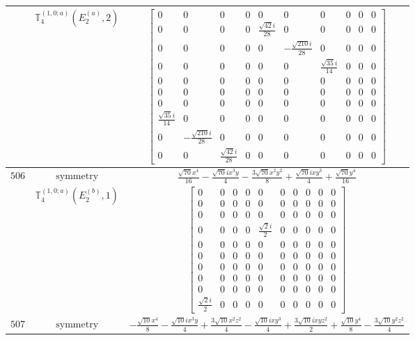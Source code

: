 \documentclass[fleqn,8pt,landscape]{jsarticle}
\begin{document}
\begin{longtable}{ccc}
$  $ & $ \mathbb{T}_{4}^{(1,0;a)}(E_{2}^{(a)},2) $ & $ \begin{bmatrix} 0 & 0 & 0 & 0 & 0 & 0 & 0 & 0 & 0 & 0 \\ 0 & 0 & 0 & 0 & \frac{\sqrt{42} i}{28} & 0 & 0 & 0 & 0 & 0 \\ 0 & 0 & 0 & 0 & 0 & - \frac{\sqrt{210} i}{28} & 0 & 0 & 0 & 0 \\ 0 & 0 & 0 & 0 & 0 & 0 & \frac{\sqrt{35} i}{14} & 0 & 0 & 0 \\ 0 & 0 & 0 & 0 & 0 & 0 & 0 & 0 & 0 & 0 \\ 0 & 0 & 0 & 0 & 0 & 0 & 0 & 0 & 0 & 0 \\ 0 & 0 & 0 & 0 & 0 & 0 & 0 & 0 & 0 & 0 \\ \frac{\sqrt{35} i}{14} & 0 & 0 & 0 & 0 & 0 & 0 & 0 & 0 & 0 \\ 0 & - \frac{\sqrt{210} i}{28} & 0 & 0 & 0 & 0 & 0 & 0 & 0 & 0 \\ 0 & 0 & \frac{\sqrt{42} i}{28} & 0 & 0 & 0 & 0 & 0 & 0 & 0 \end{bmatrix} $ \\ \hline
$ 506 $ & $ \text{symmetry} $ & $ \frac{\sqrt{70} x^{4}}{16} - \frac{\sqrt{70} i x^{3} y}{4} - \frac{3 \sqrt{70} x^{2} y^{2}}{8} + \frac{\sqrt{70} i x y^{3}}{4} + \frac{\sqrt{70} y^{4}}{16} $ \\
$  $ & $ \mathbb{T}_{4}^{(1,0;a)}(E_{2}^{(b)},1) $ & $ \begin{bmatrix} 0 & 0 & 0 & 0 & 0 & 0 & 0 & 0 & 0 & 0 \\ 0 & 0 & 0 & 0 & 0 & 0 & 0 & 0 & 0 & 0 \\ 0 & 0 & 0 & 0 & 0 & 0 & 0 & 0 & 0 & 0 \\ 0 & 0 & 0 & 0 & \frac{\sqrt{2} i}{2} & 0 & 0 & 0 & 0 & 0 \\ 0 & 0 & 0 & 0 & 0 & 0 & 0 & 0 & 0 & 0 \\ 0 & 0 & 0 & 0 & 0 & 0 & 0 & 0 & 0 & 0 \\ 0 & 0 & 0 & 0 & 0 & 0 & 0 & 0 & 0 & 0 \\ 0 & 0 & 0 & 0 & 0 & 0 & 0 & 0 & 0 & 0 \\ 0 & 0 & 0 & 0 & 0 & 0 & 0 & 0 & 0 & 0 \\ \frac{\sqrt{2} i}{2} & 0 & 0 & 0 & 0 & 0 & 0 & 0 & 0 & 0 \end{bmatrix} $ \\ \hline
$ 507 $ & $ \text{symmetry} $ & $ - \frac{\sqrt{10} x^{4}}{8} - \frac{\sqrt{10} i x^{3} y}{4} + \frac{3 \sqrt{10} x^{2} z^{2}}{4} - \frac{\sqrt{10} i x y^{3}}{4} + \frac{3 \sqrt{10} i x y z^{2}}{2} + \frac{\sqrt{10} y^{4}}{8} - \frac{3 \sqrt{10} y^{2} z^{2}}{4} $ \\

\end{longtable}
\end{document}
